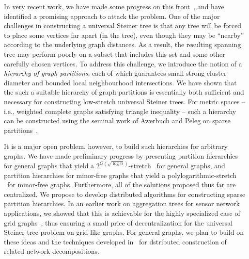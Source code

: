 In very recent work, we have made some progress on this
front~\cite{busch+drrs:ust}, and have identified a promising approach
to attack the problem.  One of the major challenges in constructing a
universal Steiner tree is that any tree will be forced to place some
vertices far apart (in the tree), even though they may be ``nearby''
according to the underlying graph distances.  As a result, the
resulting spanning tree may perform poorly on a subset that includes
this set and some other carefully chosen vertices.  To address this
challenge, we introduce the notion of a {\em hierarchy of graph
  partitions}, each of which guarantees small strong cluster diameter
and bounded local neighbourhood intersections.  We have shown that the
such a suitable hierarchy of graph partitions is essentially both
sufficient and necessary for constructing low-stretch universal
Steiner trees.  For metric spaces -- i.e., weighted complete graphs
satisfying triangle inequality -- such a hierarchy can be constructed
using the seminal work of Awerbuch and Peleg on sparse
partitions~\cite{awerbuch+p:partition,peleg:distributeBook}.

It is a major open problem, however, to build such hierarchies for
arbitrary graphs.  We have made preliminary progress by presenting
partition hierarchies for general graphs that yield a $2^{O(\sqrt{\log
    n})}$-stretch \ust\ for general graphs, and partition hierarchies
for minor-free graphs that yield a polylogarithmic-stretch \ust\ for
minor-free graphs.  Furthermore, all of the solutions proposed thus
far are centralized.  We propose to develop distributed algorithms for
constructing sparse partition hierarchies.  In an earlier work on
aggregation trees for sensor network applications, we showed that this
is achievable for the highly specialized case of grid
graphs~\cite{jia+nrs:gist}, thus ensuring a small price of
decentralization for the universal Steiner tree problem on grid-like
graphs.  For general graphs, we plan to build on these ideas and the
techniques developed in~\cite{peleg:distributeBook} for dstributed construction
of related network decompositions.

